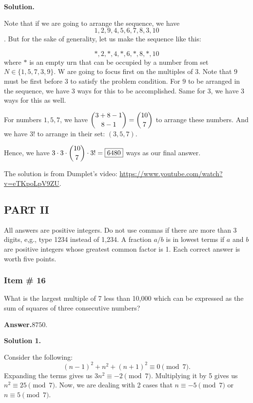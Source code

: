 \documentclass[11pt,paper=letter]{scrartcl}
\newcommand{\ans}[1]{{\sffamily \bfseries Answer.}\;\(\boxed{\text{#1}}\).}
\newcommand{\sol}{{\sffamily \bfseries Solution.}\;}
\newcommand{\soln}[1]{{\sffamily \bfseries Solution #1.}\;}
\newenvironment{rem}%
{\noindent \ignorespaces \small \sffamily  \sansmath {\bfseries \color{DarkMidnightBlue} Remark.}}%
{\ignorespacesafterend}
\begin{document}
\sol

Note that if we are going to arrange the sequence, we have $$ 1, 2, 9, 4, 5, 6, 7, 8, 3, 10 $$. But for the sake of generality, let us make the sequence like this:

$$ *, 2, *, 4, *, 6, *, 8, *, 10 $$ where $*$ is an empty urn that can be occupied by a number from set $N \in \{1,5,7,3,9\}$. W are going to focus first on the multiples of 3. Note that $9$ must be first before $3$ to satisfy the problem condition. For $9$ to be arranged in the sequence, we have 3 ways for this to be accomplished. Same for $3$, we have 3 ways for this as well. 

For numbers $1,5,7$, we have $\dbinom{3+8-1}{8-1} = \dbinom{10}{7}$ to arrange these numbers. And we have $3!$ to arrange in their set: $(3,5,7)$. 

Hence, we have $3 \cdot 3 \cdot \dbinom{10}{7} \cdot 3! = \fbox{6480}$ ways as our final answer.

\begin{mdframed}
\begin{rem}
The solution is from Dumplet's video: \url{https://www.youtube.com/watch?v=eTKpoLpV9ZU}.
\end{rem}
\end{mdframed}

\newpage

\subsection{PART II}

All answers are positive integers. Do not use commas if there are more than 3 digits, e,g., type 1234 instead of 1,234. A fraction $a/b$ is in lowest terms if $a$ and $b$ are positive integers whose greatest common factor is 1. Each correct answer is worth five points. 

\subsubsection{Item \# 16}

\begin{probboxed}
What is the largest multiple of 7 less than 10,000 which can be expressed as the sum of squares of three consecutive numbers?
\end{probboxed}

\ans{8750}

\soln1 

Consider the following: $$(n-1)^2 + n^2 + (n+1)^2 \equiv 0 \pmod{7}.$$ Expanding the terms gives us $3n^2 \equiv -2 \pmod{7}$. Multiplying it by 5 gives us $n^2 \equiv 25 \pmod{7}$. Now, we are dealing with 2 cases that $n \equiv -5 \pmod{7}$ or $n \equiv 5 \pmod{7}$.
\end{document}
